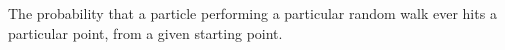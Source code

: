 The probability that a particle performing a particular
random walk ever hits a particular point, from a given
starting point.